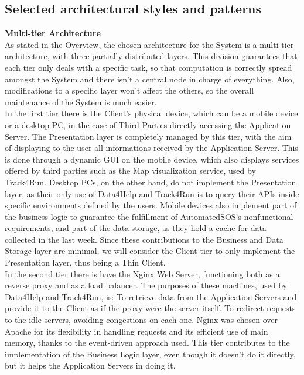 \documentclass[titlepage]{article}
\begin{document}
\vspace{\baselineskip}

\pagebreak



\subsection{Selected architectural styles and patterns}

{\bf Multi-tier Architecture }\\ 
As stated in the Overview, the chosen architecture for the System is a multi-tier architecture, with three partially distributed layers. This division guarantees that each tier only deals with a specific task, so that computation is correctly spread amongst the System and there isn’t a central node in charge of everything. Also, modifications to a specific layer won’t affect the others, so the overall maintenance of the System is much easier.\\

In the first tier there is the Client’s physical device, which can be a mobile device or a desktop PC, in the case of Third Parties directly accessing the Application Server.
The Presentation layer is completely managed by this tier, with the aim of displaying to the user all informations received by the Application Server. This is done through a dynamic GUI on the mobile device, which also displays services offered by third parties such as the Map visualization service, used by Track4Run. Desktop PCs, on the other hand, do not implement the Presentation layer, as their only use of Data4Help and Track4Run is to query their APIs inside specific environments defined by the users.
Mobile devices also implement part of the business logic to guarantee the fulfillment of AutomatedSOS's nonfunctional requirements, and part of the data storage, as they hold a cache for data collected in the last week. Since these contributions to the Business and Data Storage layer are minimal, we will consider the Client tier to only implement the Presentation layer, thus being a Thin Client.\\

In the second tier there is have the Nginx Web Server, functioning both as a reverse proxy and as a load balancer. The purposes of these machines, used by Data4Help and Track4Run, is:
To retrieve data from the Application Servers and provide it to the Client as if the proxy were the server itself.
To redirect requests to the idle servers, avoiding congestions on each one.
Nginx was chosen over Apache for its flexibility in handling requests and its efficient use of main memory, thanks to the event-driven approach used.
This tier contributes to the implementation of the Business Logic layer, even though it doesn’t do it directly, but it helps the Application Servers in doing it.\\
\end{document}
